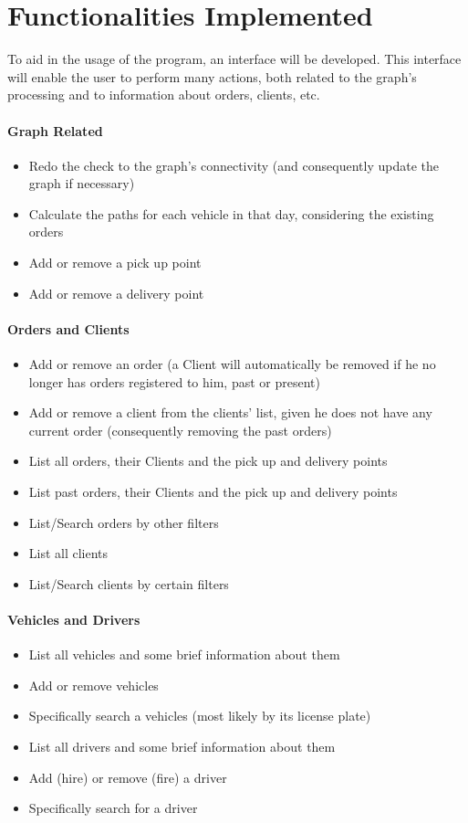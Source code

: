 \chapter{Functionalities Implemented}

To aid in the usage of the program, an interface will be developed. This interface will enable the user to perform many actions, both related to the graph's processing and to information about orders, clients, etc.

\subsubsection{Graph Related}
\begin{itemize}
    \item Redo the check to the graph's connectivity (and consequently update the graph if necessary)
    \item Calculate the paths for each vehicle in that day, considering the existing orders
    \item Add or remove a pick up point
    \item Add or remove a delivery point
\end{itemize}

\subsubsection{Orders and Clients}
\begin{itemize}
    \item Add or remove an order (a Client will automatically be removed if he no longer has orders registered to him, past or present)
    \item Add or remove a client from the clients' list, given he does not have any current order (consequently removing the past orders)
    \item List all orders, their Clients and the pick up and delivery points
    \item List past orders, their Clients and the pick up and delivery points
    \item List/Search orders by other filters
    \item List all clients 
    \item List/Search clients by certain filters
\end{itemize}

\subsubsection{Vehicles and Drivers}
\begin{itemize}
    \item List all vehicles and some brief information about them
    \item Add or remove vehicles
    \item Specifically search a vehicles (most likely by its license plate)
    \item List all drivers and some brief information about them
    \item Add (hire) or remove (fire) a driver
    \item Specifically search for a driver
\end{itemize}
